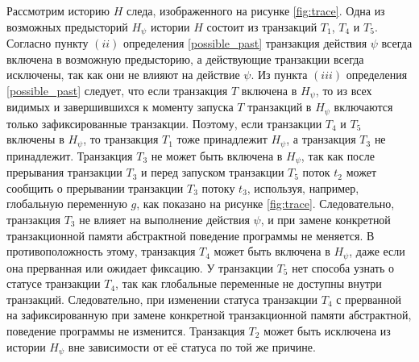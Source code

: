 Рассмотрим историю $H$ следа, изображенного на рисунке \ref{fig:trace}. Одна из возможных предысторий $H_{\psi}$ истории $H$ состоит из транзакций $T_1$, $T_4$ и $T_5$. Согласно пункту $(ii)$ определения \ref{possible_past} транзакция действия $\psi$ всегда включена в возможную предысторию, а действующие транзакции всегда исключены, так как они не влияют на действие $\psi$. Из пункта $(iii)$ определения \ref{possible_past} следует, что если транзакция $T$ включена в $H_{\psi}$, то из всех видимых и завершившихся к моменту запуска $T$ транзакций в $H_{\psi}$ включаются только зафиксированные транзакции. Поэтому, если транзакции $T_4$ и $T_5$ включены в $H_{\psi}$, то транзакция $T_1$ тоже принадлежит $H_{\psi}$, а транзакция $T_3$ не принадлежит. Транзакция $T_3$ не может быть включена в $H_{\psi}$, так как после прерывания транзакции $T_3$ и перед запуском транзакции $T_5$ поток $t_2$ может сообщить о прерывании транзакции $T_3$ потоку $t_3$, используя, например, глобальную переменную $g$, как показано на рисунке \ref{fig:trace}. Следовательно, транзакция $T_3$ не влияет на выполнение действия $\psi$, и при замене конкретной транзакционной памяти абстрактной поведение программы не меняется. В противоположность этому, транзакция $T_4$ может быть включена в $H_{\psi}$, даже если она прерванная или ожидает фиксацию. У транзакции $T_5$ нет способа узнать о статусе транзакции $T_4$, так как глобальные переменные не доступны внутри транзакций. Следовательно, при изменении статуса транзакции $T_4$ с прерванной на зафиксированную при замене конкретной транзакционной памяти абстрактной, поведение программы не изменится. Транзакция $T_2$ может быть исключена из истории $H_{\psi}$ вне зависимости от её статуса по той же причине. 

